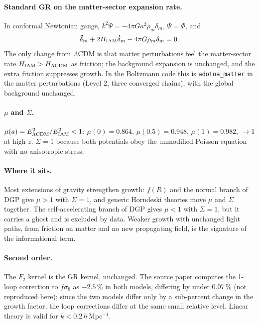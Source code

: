 \paragraph{Standard GR on the matter-sector expansion rate.} In conformal Newtonian gauge, $k^2\Psi=-4\pi Ga^2\rho_m\delta_m$, $\Psi=\Phi$, and
\begin{equation}\ddot\delta_m+2H_{\rm IAM}\dot\delta_m-4\pi G\rho_m\delta_m=0 .\end{equation}
The only change from $\Lambda$CDM is that matter perturbations feel the matter-sector rate $H_{\rm IAM}>H_{\Lambda\rm CDM}$ as friction; the
background expansion is unchanged, and the extra friction suppresses growth. In the Boltzmann code this is
\texttt{adotoa\_matter} in the matter perturbations (Level 2, three converged chains), with the global background unchanged.
\paragraph{$\mu$ and $\Sigma$.} $\mu(a)=E^2_{\Lambda\rm CDM}/E^2_{\rm IAM}<1$: $\mu(0)=0.864$, $\mu(0.5)=0.948$, $\mu(1)=0.982$, $\to1$ at high $z$. $\Sigma=1$
because both potentials obey the unmodified Poisson equation with no anisotropic stress. \calc
\paragraph{Where it sits.} Most extensions of gravity strengthen growth: $f(R)$ and the normal branch of DGP give $\mu>1$ with $\Sigma=1$, and generic
Horndeski theories move $\mu$ and $\Sigma$ together. The self-accelerating branch of DGP gives $\mu<1$ with $\Sigma=1$, but it carries a ghost and is
excluded by data. Weaker growth with unchanged light paths, from friction on matter and no new propagating field, is the signature of the informational term.
\paragraph{Second order.} The $F_2$ kernel is the GR kernel, unchanged. The source paper computes the 1-loop correction to $f\sigma_8$ as $-2.5\,\%$ in both models,
differing by under $0.07\,\%$ (not reproduced here); since the two models differ only by a sub-percent change in the growth factor, the loop corrections
differ at the same small relative level. Linear theory is valid for $k<0.2\,h$\,Mpc$^{-1}$.

